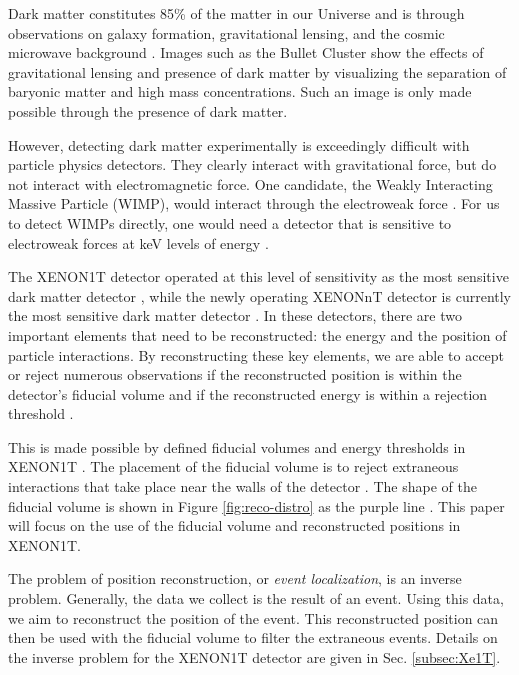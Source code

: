 \documentclass[thesis.tex]{subfiles}
\begin{document}
Dark matter constitutes 85\% of the matter in our Universe and is through observations on galaxy formation, gravitational lensing, and the cosmic microwave background \cite{DM_Hist}.
Images such as the Bullet Cluster show the effects of gravitational lensing and presence of dark matter by visualizing the separation of baryonic matter and high mass concentrations.
Such an image is only made possible through the presence of dark matter.


\par However, detecting dark matter experimentally is exceedingly difficult with particle physics detectors.
They clearly interact with gravitational force, but do not interact with electromagnetic force.
One candidate, the Weakly Interacting Massive Particle (WIMP), would interact through the electroweak force \cite{DM_Hist}.
For us to detect WIMPs directly, one would need a detector that is sensitive to electroweak forces at keV levels of energy \cite{DM_Hist}.

\par The XENON1T detector operated at this level of sensitivity as the most sensitive dark matter detector \cite{Xenon1t}, while the newly operating XENONnT detector is currently the most sensitive dark matter detector \cite{nT_Projection}.
In these detectors, there are two important elements that need to be reconstructed: the energy and the position of particle interactions.
By reconstructing these key elements, we are able to accept or reject numerous observations if the reconstructed position is within the detector's fiducial volume and if the reconstructed energy is within a rejection threshold \cite{1TDM_DataAnalysis}.

\par This is made possible by defined fiducial volumes and energy thresholds in XENON1T \cite{1TDM_DataAnalysis}.
The placement of the fiducial volume is to reject extraneous interactions that take place near the walls of the detector \cite{1TDM_DataAnalysis}.
The shape of the fiducial volume is shown in Figure \ref{fig:reco-distro} as the purple line \cite{Xe1T-YearExpo}.
This paper will focus on the use of the fiducial volume and reconstructed positions in XENON1T.

\par The problem of position reconstruction, or \textit{event localization}, is an inverse problem.
Generally, the data we collect is the result of an event.
Using this data, we aim to reconstruct the position of the event.
This reconstructed position can then be used with the fiducial volume to filter the extraneous events.
Details on the inverse problem for the XENON1T detector are given in Sec. \ref{subsec:Xe1T}.
\end{document}
